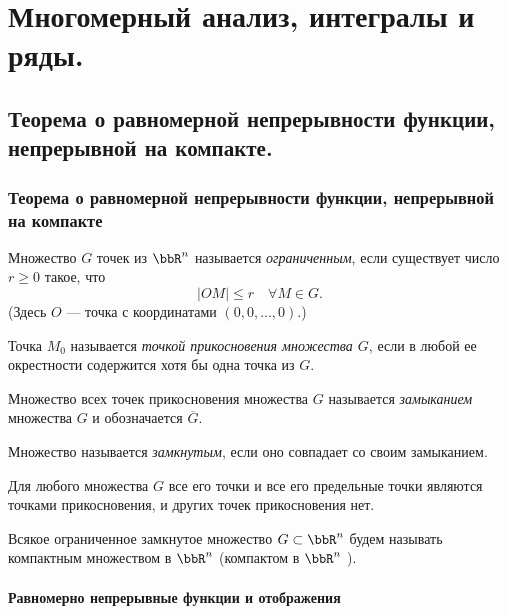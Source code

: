 \part{Многомерный анализ, интегралы и ряды.}
\chapter[Теорема о равномерной непрерывности функции, непрерывной на компакте.]{Теорема о равномерной непрерывности функции, непрерывной на компакте.}
\section{Теорема о равномерной непрерывности функции, непрерывной на компакте}

\begin{defn}
Множество $G$ точек из $\bbR ^n$ называется \textit{ограниченным}, если существует число $r\ge 0$ такое, что
$$
|OM|\le r \quad \forall M\in G.
$$
(Здесь $O$ --- точка с координатами $(0, 0, \ldots , 0).$)
\end{defn}

\begin{defn}
Точка $M_0$ называется \textit{точкой прикосновения множества $G$}, если в любой ее окрестности содержится хотя бы одна точка из $G$.
\end{defn}

\begin{defn}
Множество всех точек прикосновения множества $G$ называется \textit{замыканием} множества $G$ и обозначается $\overline{G}$.
\end{defn}

\begin{defn}
Множество называется \textit{замкнутым}, если оно совпадает со своим замыканием.
\end{defn}

Для любого множества $G$ все его точки и все его предельные точки являются точками прикосновения, и других точек прикосновения нет.

\begin{defn}
Всякое ограниченное замкнутое множество $G \subset \bbR^n$ будем называть компактным множеством в $\bbR^n$ (компактом в $\bbR^n$ ).
\end{defn}


\subsection{Равномерно непрерывные функции и отображения}

